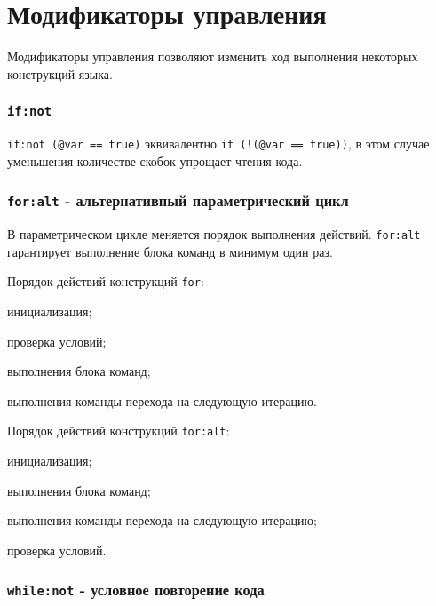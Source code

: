 
\section{Модификаторы управления}

\label{sec-modifiers}

Модификаторы управления позволяют изменить ход выполнения некоторых конструкций языка.

\subsubsection{\texttt{if:not}}

\texttt{if:not (@var == true)} эквивалентно \texttt{if (!(@var == true))}, в этом случае уменьшения количестве скобок упрощает чтения кода.

\subsubsection{\texttt{for:alt} - альтернативный параметрический цикл}

В параметрическом цикле меняется порядок выполнения действий. \texttt{for:alt} гарантирует выполнение блока команд в минимум один раз.

Порядок действий конструкций \texttt{for}:
\begin{icEnum}
    \item инициализация;
	\item проверка условий;
	\item выполнения блока команд;
	\item выполнения команды перехода на следующую итерацию.
\end{icEnum}

Порядок действий конструкций \texttt{for:alt}:
\begin{icEnum}
    \item инициализация;
	\item выполнения блока команд;
	\item выполнения команды перехода на следующую итерацию;
	\item проверка условий.
\end{icEnum}

\subsubsection{\texttt{while:not} - условное повторение кода}

